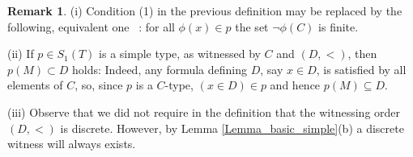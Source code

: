 \documentclass[12pt]{amsart}
\theoremstyle{definition}
\newtheorem{Remark}[Theorem]{Remark}
\begin{document}
\begin{Remark}
(i) Condition (1) in the previous definition may be replaced by the following, equivalent one \ : 
  for all $\phi(x)\in p$ the set $\lnot \phi(C)$ is finite. 

\smallskip
(ii)  If $p\in S_1(T)$ is a simple type, as witnessed by $C$ and $(D,<)$, then $p(M)\subset D$ holds: Indeed, any formula defining $D$, say $x\in D$, is satisfied by all elements of $C$, so, since $p$ is a $C$-type, $(x\in D)\in p$ and hence $p(M)\subseteq D$. 

\smallskip (iii) Observe that we did  not require in the definition that the witnessing order $(D,<)$ is discrete.  However, by Lemma \ref{Lemma_basic_simple}(b)  a discrete witness will always exists. 
\end{Remark}
\end{document}
